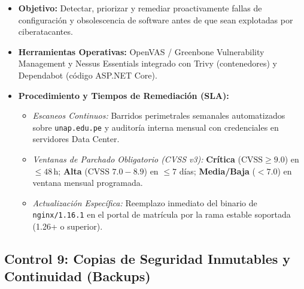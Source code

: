 \begin{itemize}
    \item \textbf{Objetivo:} Detectar, priorizar y remediar proactivamente fallas de configuración y obsolescencia de software antes de que sean explotadas por ciberatacantes.
    \item \textbf{Herramientas Operativas:} OpenVAS / Greenbone Vulnerability Management y Nessus Essentials integrado con Trivy (contenedores) y Dependabot (código ASP.NET Core).
    \item \textbf{Procedimiento y Tiempos de Remediación (SLA):}
    \begin{itemize}
        \item \textit{Escaneos Continuos:} Barridos perimetrales semanales automatizados sobre \texttt{unap.edu.pe} y auditoría interna mensual con credenciales en servidores Data Center.
        \item \textit{Ventanas de Parchado Obligatorio (CVSS v3):} \textbf{Crítica} ($\text{CVSS} \ge 9.0$) en $\le 48$\,h; \textbf{Alta} ($\text{CVSS } 7.0 - 8.9$) en $\le 7$ días; \textbf{Media/Baja} ($< 7.0$) en ventana mensual programada.
        \item \textit{Actualización Específica:} Reemplazo inmediato del binario de \texttt{nginx/1.16.1} en el portal de matrícula por la rama estable soportada (1.26+ o superior).
    \end{itemize}
\end{itemize}

\newpage
\subsection{Control 9: Copias de Seguridad Inmutables y Continuidad (Backups)}

